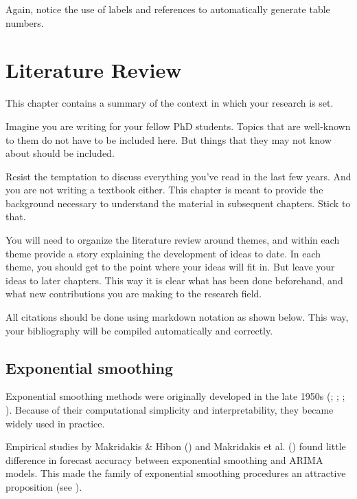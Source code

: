 \documentclass[
  11pt,
  a4paper,
  nottoc]{report}
\begin{document}
Again, notice the use of labels and references to automatically generate
table numbers.


\chapter{Literature Review}\label{sec-litreview}

This chapter contains a summary of the context in which your research is
set.

Imagine you are writing for your fellow PhD students. Topics that are
well-known to them do not have to be included here. But things that they
may not know about should be included.

Resist the temptation to discuss everything you've read in the last few
years. And you are not writing a textbook either. This chapter is meant
to provide the background necessary to understand the material in
subsequent chapters. Stick to that.

You will need to organize the literature review around themes, and
within each theme provide a story explaining the development of ideas to
date. In each theme, you should get to the point where your ideas will
fit in. But leave your ideas to later chapters. This way it is clear
what has been done beforehand, and what new contributions you are making
to the research field.

All citations should be done using markdown notation as shown below.
This way, your bibliography will be compiled automatically and
correctly.

\section{Exponential smoothing}\label{sec-expsmooth}

Exponential smoothing methods were originally developed in the late
1950s (; ; ;
). Because of their computational
simplicity and interpretability, they became widely used in practice.

Empirical studies by Makridakis \& Hibon () and
Makridakis et al. () found little difference
in forecast accuracy between exponential smoothing and ARIMA models.
This made the family of exponential smoothing procedures an attractive
proposition (see ).
\end{document}
